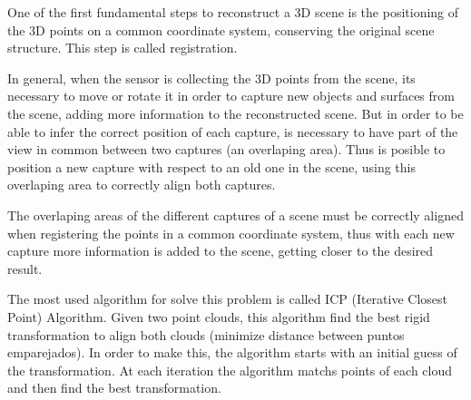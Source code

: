 One of the first fundamental steps to reconstruct a 3D scene is the 
positioning of the 3D points on a common coordinate system, conserving 
the original scene structure. This step is called registration. 

In general, when the sensor is collecting the 3D points from the scene, 
 its necessary to move or rotate it in order to capture new objects and surfaces from 
the scene, adding more information to the reconstructed scene. But in order to be 
able to infer the correct position of each capture, is necessary to have part 
of the view in common between two captures (an overlaping area). Thus is posible 
to position a new capture with respect to an old one in the scene, using this overlaping 
area to correctly align both captures.
 
The overlaping areas of the different captures of a scene must be correctly 
aligned when registering the points in a common coordinate system, 
thus with each new capture more information is added to the scene, 
getting closer to the desired result. 

The most used algorithm for solve this problem is called 
ICP (Iterative Closest Point) Algorithm. Given two point clouds, 
this algorithm find the best rigid transformation to align both clouds 
(minimize distance between puntos emparejados). In order to make this, 
the algorithm starts with an initial guess of the transformation. 
At each iteration the algorithm matchs points of each cloud and then 
find the best transformation. 




